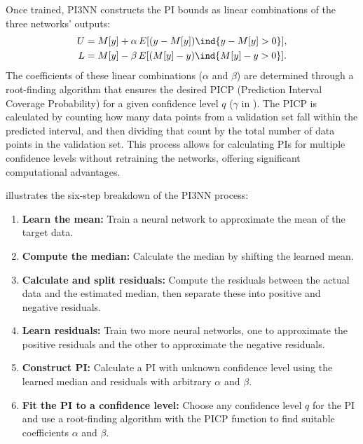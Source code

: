 Once trained, PI3NN constructs the PI bounds as linear combinations of the three networks' outputs:
\begin{align*}
    U &= M[y] + \alpha \, E[(y - M[y]) \ind{y-M[y]>0}], \\
    L &= M[y] - \beta \, E[(M[y] - y) \ind{M[y]-y>0}]. \\
\end{align*}
The coefficients of these linear combinations ($\alpha$ and $\beta$) are determined through a root-finding algorithm that ensures the desired PICP (Prediction Interval Coverage Probability) for a given confidence level $q$ ($\gamma$ in \cite{pi3nn}). The PICP is calculated by counting how many data points from a validation set fall within the predicted interval, and then dividing that count by the total number of data points in the validation set. This process allows for calculating PIs for multiple confidence levels without retraining the networks, offering significant computational advantages.

 illustrates the six-step breakdown of the PI3NN process:
\begin{enumerate}
    \item \textbf{Learn the mean:} Train a neural network to approximate the mean of the target data.
    \item \textbf{Compute the median:} Calculate the median by shifting the learned mean.
    \item \textbf{Calculate and split residuals:} Compute the residuals between the actual data and the estimated median, then separate these into positive and negative residuals.
    \item \textbf{Learn residuals:} Train two more neural networks, one to approximate the positive residuals and the other to approximate the negative residuals.
    \item \textbf{Construct PI:} Calculate a PI with unknown confidence level using the learned median and residuals with arbitrary $\alpha$ and $\beta$.
    \item \textbf{Fit the PI to a confidence level:} Choose any confidence level $q$ for the PI and use a root-finding algorithm with the PICP function to find suitable coefficients $\alpha$ and $\beta$.
\end{enumerate}


